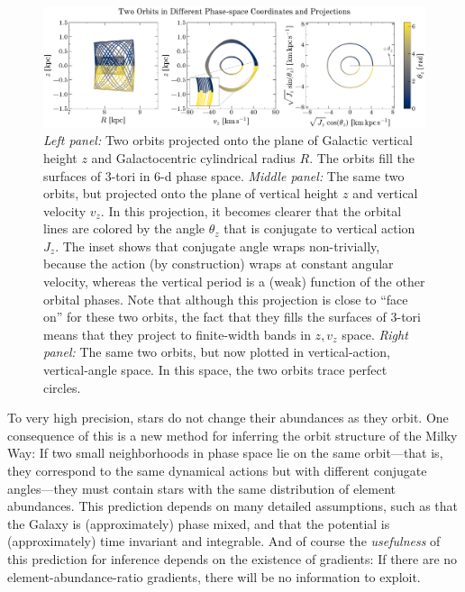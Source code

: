 \documentclass[modern]{aastex63}
\begin{document}
\begin{figure}[!tp]
  \begin{mdframed}
  \begin{center}
  \includegraphics[width=\textwidth]{zvz-orbit-demo.pdf}
  \end{center}
  \caption{%
    \textsl{Left panel:} Two orbits projected onto the plane of
    Galactic vertical height $z$ and Galactocentric cylindrical radius
    $R$. The orbits fill the surfaces of 3-tori in 6-d phase space.
    \textsl{Middle panel:} The same two orbits, but projected onto the plane
    of vertical height $z$ and vertical velocity $v_z$. In this projection,
    it becomes clearer that the orbital lines are
    colored by the angle $\theta_z$ that is conjugate to vertical action $J_z$.
    The inset shows that conjugate angle wraps non-trivially, because the action
    (by construction) wraps at constant angular velocity, whereas the vertical period
    is a (weak) function of the other orbital phases.
    Note that although this projection is close to ``face on'' for these two
    orbits, the fact that they fills the surfaces of 3-tori means that they
    project to finite-width bands in $z, v_z$ space.
    \textsl{Right panel:} The same two orbits, but now plotted in vertical-action,
    vertical-angle space. In this space, the two orbits trace perfect circles.
  \label{fig:zvz-demo}
  }
  \end{mdframed}
\end{figure}

To very high precision, stars do not change their abundances as they orbit.
One consequence of this is a new method for inferring the orbit structure of the
Milky Way:
If two small neighborhoods in phase space lie on the same orbit---that is, they
correspond to the same dynamical actions but with different conjugate
angles---they must contain stars with the same distribution of element
abundances.
This prediction depends on many detailed assumptions, such as that the Galaxy is
(approximately) phase mixed, and that the potential is (approximately) time
invariant and integrable.
And of course the \emph{usefulness} of this prediction for inference depends on
the existence of gradients: If there are no element-abundance-ratio gradients,
there will be no information to exploit.
\end{document}
